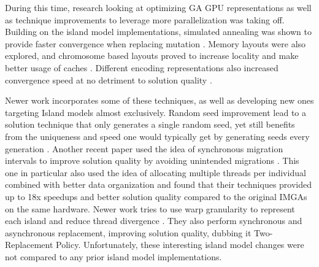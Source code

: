 \documentclass[11pt]{article}       %
\begin{document}
During this time, research looking at optimizing GA GPU representations as well as technique improvements to leverage more parallelization was taking off. Building on the island model implementations, simulated annealing was shown to provide faster convergence when replacing mutation \cite{li2017parallel}. Memory layouts were also explored, and chromosome based layouts proved to increase locality and make better usage of caches \cite{jahne2016overview}. Different encoding representations also increased convergence speed at no detriment to solution quality \cite{Pedemonte2011-zu}. 

Newer work incorporates some of these techniques, as well as developing new ones targeting Island models almost exclusively. Random seed improvement lead to a solution technique that only generates a single random seed, yet still benefits from the uniqueness and speed one would typically get by generating seeds every generation \cite{Sun2019-fj}. Another recent paper used the idea of synchronous migration intervals to improve solution quality by avoiding unintended migrations \cite{Janssen2022-kr}. This one in particular also used the idea of allocating multiple threads per individual \cite{shah2010gpu} combined with better data organization and found that their techniques provided up to 18x speedups and better solution quality compared to the original IMGAs on the same hardware.
Newer work tries to use warp granularity to represent each island and reduce thread divergence \cite{Amin2022-xd}. They also perform synchronous and asynchronous replacement, improving solution quality, dubbing it Two-Replacement Policy. Unfortunately, these interesting island model changes were not compared to any prior island model implementations.




\end{document}
